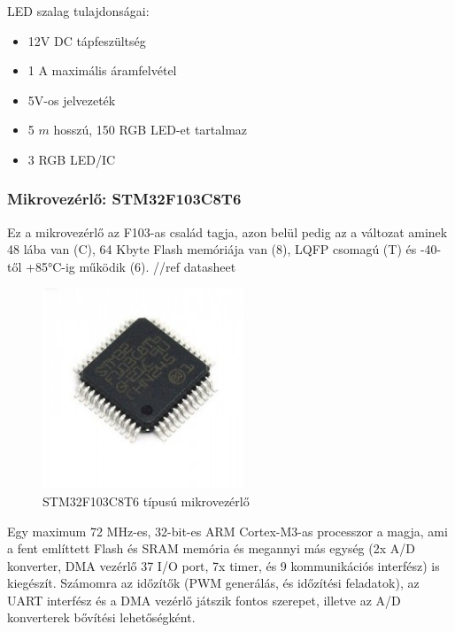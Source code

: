 \documentclass[../main.tex]{subfiles}
\begin{document}
            LED szalag tulajdonságai:
            \begin{itemize}
                \item 12V DC tápfeszültség
                \item 1 A maximális áramfelvétel
                \item 5V-os jelvezeték
                \item 5 $m$ hosszú, 150 RGB LED-et tartalmaz
                \item 3 RGB LED/IC
            \end{itemize}
            
        \subsubsection{Mikrovezérlő: STM32F103C8T6}
            Ez a mikrovezérlő az F103-as család tagja, azon belül pedig az a változat aminek 48 lába van (C), 64 Kbyte Flash memóriája van (8), LQFP csomagú (T) és -40-től +85°C-ig működik (6). //ref datasheet
            
            \begin{figure}[h!] %
                \centering
                \includegraphics[width=6cm]{resources/pcb_res/stm32f103c8t6.jpg}
                \caption{STM32F103C8T6 típusú mikrovezérlő}
                \label{fig:stm32f103_ic}
            \end{figure}
            
            Egy maximum 72 MHz-es, 32-bit-es ARM Cortex-M3-as processzor a magja, ami a fent említtett Flash és SRAM memória és megannyi más egység (2x A/D konverter, DMA vezérlő 37 I/O port, 7x timer, és 9 kommunikációs interfész) is kiegészít. Számomra az időzítők (PWM generálás, és időzítési feladatok), az UART interfész és a DMA vezérlő játszik fontos szerepet, illetve az A/D konverterek bővítési lehetőségként.
            
\end{document}
